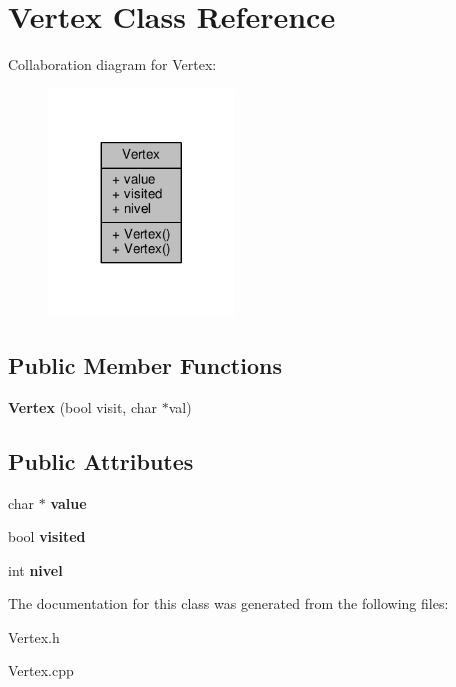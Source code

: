 \hypertarget{class_vertex}{\section{Vertex Class Reference}
\label{class_vertex}
}


Collaboration diagram for Vertex\+:
\nopagebreak
\begin{figure}[H]
\begin{center}
\leavevmode
\includegraphics[width=140pt]{class_vertex__coll__graph}
\end{center}
\end{figure}
\subsection*{Public Member Functions}
\begin{DoxyCompactItemize}
\item 
\hypertarget{class_vertex_a30feb00a36bf5da73c84056a0aa1c7eb}{{\bfseries Vertex} (bool visit, char $\ast$val)}\label{class_vertex_a30feb00a36bf5da73c84056a0aa1c7eb}

\end{DoxyCompactItemize}
\subsection*{Public Attributes}
\begin{DoxyCompactItemize}
\item 
\hypertarget{class_vertex_a05c7844feef250d9a319ac49d1dbdfa4}{char $\ast$ {\bfseries value}}\label{class_vertex_a05c7844feef250d9a319ac49d1dbdfa4}

\item 
\hypertarget{class_vertex_aaef9f7de91b4b8f1752d391a1aae9c2e}{bool {\bfseries visited}}\label{class_vertex_aaef9f7de91b4b8f1752d391a1aae9c2e}

\item 
\hypertarget{class_vertex_a7fc49a2ab06e5d4cad86278c65303fc2}{int {\bfseries nivel}}\label{class_vertex_a7fc49a2ab06e5d4cad86278c65303fc2}

\end{DoxyCompactItemize}


The documentation for this class was generated from the following files\+:\begin{DoxyCompactItemize}
\item 
Vertex.\+h\item 
Vertex.\+cpp\end{DoxyCompactItemize}
